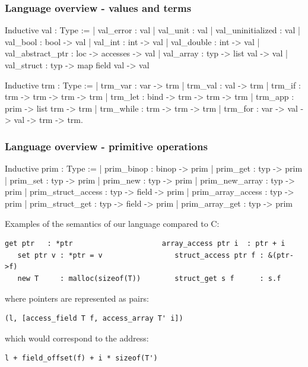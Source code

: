 \begin{frame}[fragile]
\frametitle{Language overview - values and terms}

\begin{coqs}
Inductive val : Type :=
  | val_error : val
  | val_unit : val
  | val_uninitialized : val
  | val_bool : bool -> val
  | val_int : int -> val
  | val_double : int -> val
  | val_abstract_ptr : loc -> accesses -> val
  | val_array : typ -> list val -> val
  | val_struct : typ -> map field val -> val
\end{coqs}

\begin{coqs}
Inductive trm : Type :=
  | trm_var : var -> trm
  | trm_val : val -> trm
  | trm_if : trm -> trm -> trm -> trm
  | trm_let : bind -> trm -> trm -> trm
  | trm_app : prim -> list trm -> trm
  | trm_while : trm -> trm -> trm
  | trm_for : var -> val -> val -> trm -> trm.
\end{coqs}

\end{frame}


\begin{frame}[fragile]
\frametitle{Language overview - primitive operations}

\begin{coqs}
  Inductive prim : Type :=
    | prim_binop : binop -> prim
    | prim_get : typ -> prim
    | prim_set : typ -> prim
    | prim_new : typ -> prim
    | prim_new_array : typ -> prim
    | prim_struct_access : typ -> field -> prim
    | prim_array_access : typ -> prim
    | prim_struct_get : typ -> field -> prim
    | prim_array_get : typ -> prim
\end{coqs}
\pause
Examples of the semantics of our language compared to C:

\begin{Verbatim}[fontsize=\scriptsize]
   get ptr   : *ptr                     array_access ptr i  : ptr + i
   set ptr v : *ptr = v                 struct_access ptr f : &(ptr->f)
   new T     : malloc(sizeof(T))        struct_get s f      : s.f
\end{Verbatim}

where pointers are represented as pairs:

\begin{Verbatim}[fontsize=\scriptsize]
   (l, [access_field T f, access_array T' i]) 
\end{Verbatim}

which would correspond to the address:

\begin{Verbatim}[fontsize=\scriptsize]
   l + field_offset(f) + i * sizeof(T')
\end{Verbatim}

\end{frame}


